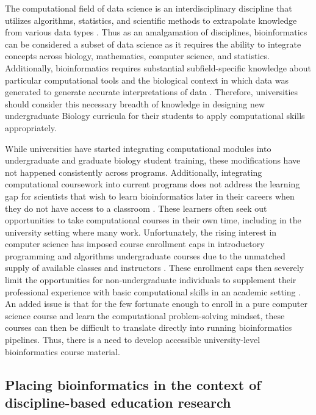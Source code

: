 The computational field of data science is an interdisciplinary discipline that utilizes algorithms, statistics, and scientific methods to extrapolate knowledge from various data types \cite{attwood2019,cao2017,getoor2019,stephens2015}. Thus as an amalgamation of disciplines, bioinformatics can be considered a subset of data science as it requires the ability to integrate concepts across biology, mathematics, computer science, and statistics. Additionally, bioinformatics requires substantial subfield-specific knowledge about particular computational tools and the biological context in which data was generated to generate accurate interpretations of data \cite{attwood2019,leonelli2019,marx2013,pal2020,rubinstein2014,tan2009}. Therefore, universities should consider this necessary breadth of knowledge in designing new undergraduate Biology curricula for their students to apply computational skills appropriately. 

While universities have started integrating computational modules into undergraduate and graduate biology student training, these modifications have not happened consistently across programs. Additionally, integrating computational coursework into current programs does not address the learning gap for scientists that wish to learn bioinformatics later in their careers when they do not have access to a classroom \cite{attwood2019,barone2017,zhan2019}. These learners often seek out opportunities to take computational courses in their own time, including in the university setting where many work. Unfortunately, the rising interest in computer science has imposed course enrollment caps in introductory programming and algorithms undergraduate courses due to the unmatched supply of available classes and instructors \cite{brodley2022,nager2016,shein2019,camp2015,jaggars2016}. These enrollment caps then severely limit the opportunities for non-undergraduate individuals to supplement their professional experience with basic computational skills in an academic setting \cite{jaggars2016,brodley2022,nager2016,camp2015,backofen2006}. An added issue is that for the few fortunate enough to enroll in a pure computer science course and learn the computational problem-solving mindset, these courses can then be difficult to translate directly into running bioinformatics pipelines. Thus, there is a need to develop accessible university-level bioinformatics course material.

\subsection{Placing bioinformatics in the context of discipline-based education research}

